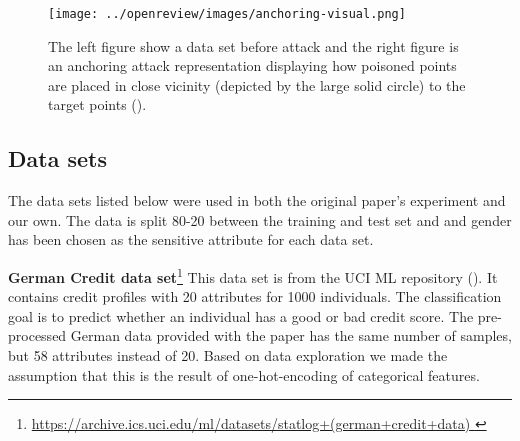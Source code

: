 \begin{figure}
\texttt{[image: ../openreview/images/anchoring-visual.png]}
\centering
\caption{The left figure show a data set before attack and the right figure is an anchoring attack representation displaying how poisoned points are placed in close vicinity (depicted by the large solid circle) to the target points (\cite{mehrabi2020exacerbating}).}
\label{anchoring_visual}
\end{figure}



\subsection{Data sets}
\label{sec:data sets}


The data sets listed below were used in both the original paper's experiment and our own.
The data is split 80-20 between the training and test set and and gender has been chosen as the sensitive attribute for each data set. 

\textbf{German Credit data set}\footnote{\href {https://archive.ics.uci.edu/ml/datasets/statlog+(german+credit+data) }{https://archive.ics.uci.edu/ml/datasets/statlog+(german+credit+data) }}
This data set is from the UCI ML repository (\cite{Dua:2019}). It contains credit profiles with 20 attributes for 1000 individuals. The classification goal is to predict whether an individual has a good or bad credit score.
The pre-processed German data provided with the paper has the same number of samples, but 58 attributes instead of 20. Based on data exploration we made the assumption that this is the result of one-hot-encoding of categorical features. 


